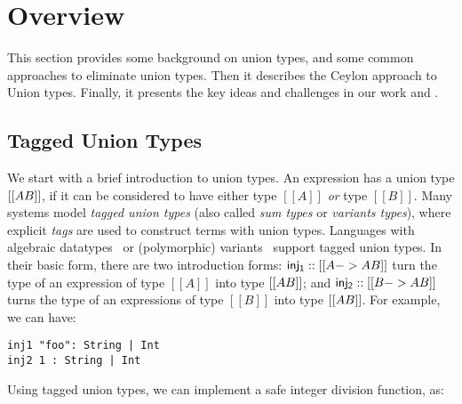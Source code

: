 \section{Overview}
\label{sec:overview}

This section provides some background on union types, and some common approaches
to eliminate union types. Then it describes the Ceylon approach to Union types.
Finally, it presents the key ideas and challenges in our work and \name.


\subsection{Tagged Union Types}


We start with a brief introduction to union types. An expression has a union
type $[[A\/B]]$, if it can be considered to have either type $[[A]]$ \textit{or}
type $[[B]]$. Many systems model \textit{tagged union types} (also called
\textit{sum types} or \textit{variants types}), where explicit \textit{tags}
are used to construct terms with union types. Languages with algebraic datatypes~\cite{hope}
or (polymorphic) variants~\cite{garrigue98} support tagged union types. 
In their basic form, there are two introduction forms:
$\mathsf{inj_1} :: [[A -> A \/ B]]$ turn the type of an expression of type
$[[A]]$ into type $[[A \/ B]]$; and $\mathsf{inj_2} :: [[B -> A \/ B]]$
turns the type of an expressions of type $[[B]]$ into type $[[A \/ B]]$.
For example, we can have:

\begin{lstlisting}
inj1 "foo": String | Int
inj2 1 : String | Int
\end{lstlisting}

\noindent Using tagged union types, we can implement a safe integer
division function, as:

